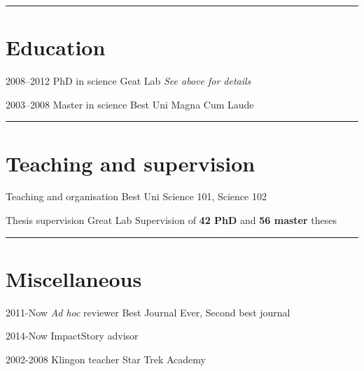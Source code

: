 \documentclass[]{friggeri-cv} %
\begin{document}
\rule{\linewidth}{0.1pt}



\section{Education}

\begin{entrylist}

\entry
{2008--2012}
{PhD {\normalfont in science}}
{Geat Lab}
{\emph{See above for details} \\
}


\entry
{2003--2008}
{Master {\normalfont in science}}
{Best Uni}
{Magna Cum Laude \\ }


\end{entrylist}




\rule{\linewidth}{0.1pt}

\section{Teaching and supervision}

\descr 
{Teaching and organisation}
{Best Uni}
{Science 101, Science 102}

\descr 
{Thesis supervision}
{Great Lab}
{Supervision of \textbf{42 PhD} and \textbf{56 master} theses}





\rule{\linewidth}{0.1pt}


\section{Miscellaneous}

\begin{entrylist}
\entry
{2011-Now}
{\textit{Ad hoc} reviewer}
{}
{Best Journal Ever, Second best journal}


\entry
{2014-Now}
{ImpactStory advisor}
{}
{}

\entry
{2002-2008}
{Klingon teacher}
{Star Trek Academy}
{}

\end{entrylist}
\end{document}
